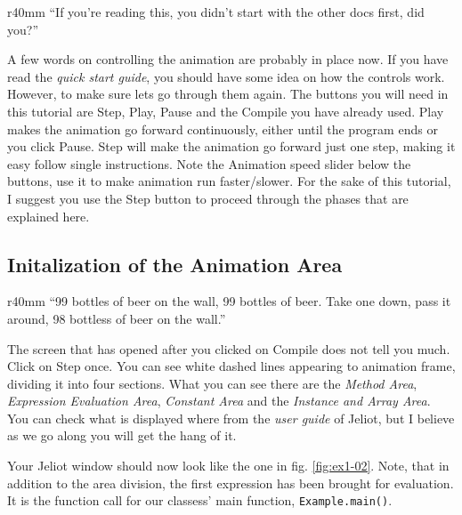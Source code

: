 \documentclass[a4paper,12pt,english]{article}
\newcommand{\jel}{Jeliot}
\newcommand{\p}[1]{\texttt{#1}}
\newcommand{\bu}[1]{\textsf{#1}}
\begin{document}
\begin{wrapfigure}[10]{r}{40mm}
\vspace{-12pt}
``If you're reading this, you didn't start with the other docs first, did you?''
\end{wrapfigure}


A few words on controlling the animation are probably in place now. If you have read the \emph{quick start guide}, you should have some idea on how the controls work. However, to make sure lets go through them again. The buttons you will need in this tutorial are \bu{Step}, \bu{Play}, \bu{Pause} and the \bu{Compile} you have already used. \bu{Play} makes the animation go forward continuously, either until the program ends or you click \bu{Pause}. \bu{Step} will make the animation go forward just one step, making it easy follow single instructions. Note the \bu{Animation speed} slider below the buttons, use it to make animation run faster/slower. For the sake of this tutorial, I suggest you use the \bu{Step} button to proceed through the phases that are explained here.


\subsection{Initalization of the Animation Area}

\begin{wrapfigure}[10]{r}{40mm}
\vspace{-12pt}
``99 bottles of beer on the wall, 99 bottles of beer. Take one down, pass it around, 98 bottless of beer on the wall.''
\end{wrapfigure}


The screen that has opened after you clicked on \bu{Compile} does not tell you much. Click on \bu{Step} once. You can see white dashed lines appearing to animation frame, dividing it into four sections. What you can see there are the \emph{Method Area}, \emph{Expression Evaluation Area}, \emph{Constant Area} and the \emph{Instance and Array Area}. You can check what is displayed where from the \emph{user guide} of \jel{}, but I believe as we go along you will get the hang of it. 

Your \jel{} window should now look like the one in fig. \ref{fig:ex1-02}. Note, that in addition to the area division, the first expression has been brought for evaluation. It is the function call for our classess' main function, \p{Example.main()}. 
\end{document}
